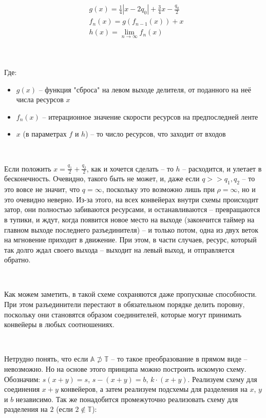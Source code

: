 \begin{align*}
	&g(x) = \frac14 \left| x-2q_0 \right| + \frac34 x - \frac{q_0}2\\
	&f_n(x) = g(f_{n-1}(x)) + x\\
	&h(x) = \lim_{n\to\infty} f_n(x)\\
\end{align*}

\

\noindent Где: 

\begin{itemize}
	\item $g(x)$ -- функция "сброса" на левом выходе делителя, от поданного на неё числа ресурсов $x$
	
	\item $f_n(x)$ -- итерационное значение скорости ресурсов на предпоследней ленте
	
	\item $x$ (в параметрах $f$ и $h$) -- то число ресурсов, что заходит от входов
\end{itemize}

\

Если положить $x = \frac{q_1}{2} + \frac{q_2}{2}$, как и хочется сделать -- то $h$ -- расходится, и улетает в бесконечность. Очевидно, такого быть не может, и, даже если $q >> q_1, q_2$ -- то это вовсе не значит, что $q = \infty$, поскольку это возможно лишь при $\rho = \infty$, но и это очевидно неверно. Из-за этого, на всех конвейерах внутри схемы происходит затор, они полностью забиваются ресурсами, и останавливаются -- превращаются в тупики, и ждут, когда появится новое место на выходе (закончится таймер на главном выходе последнего разъединителя) -- и только потом, одна из двух веток на мгновение приходит в движение. При этом, в части случаев, ресурс, который так долго ждал своего выхода -- выходит на левый выход, и отправляется обратно.

\

Как можем заметить, в такой схеме сохраняются даже пропускные способности. При этом разъединители перестают в обязательном порядке делить поровну, поскольку они становятся образом соединителей, которые могут принимать конвейеры в любых соотношениях.

\

Нетрудно понять, что если $\mathbb{A} \not\supset \mathbb{T}$ -- то такое преобразование в прямом виде -- невозможно. Но на основе этого принципа можно построить искомую схему. Обозначим: $s(x+y) = s$, $s - (x+y) = b$, $k\cdot(x+y)$. Реализуем схему для соединения $x+y$ конвейеров, а затем реализуем подсхемы для разделения на $x$, $y$ и $b$ независимо. Так же понадобится промежуточно реализовать схему для разделения на $2$ (если $2 \not\in \mathbb{T}$):






